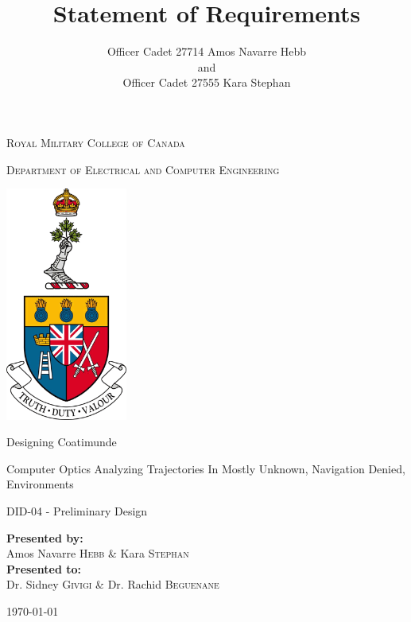 \documentclass{article}
\title{Statement of Requirements}
\author{Officer Cadet 27714 Amos Navarre Hebb\\and\\Officer Cadet 27555 Kara Stephan}
\begin{document}
	
\begin{titlepage}
	\begin{center}
		\vspace*{1cm}
		
		\LARGE\textsc{Royal Military College of Canada}\normalsize
		
		\vspace{0.2cm}
		
		\textsc{Department of Electrical and Computer Engineering}
		
		\vspace{1.5cm}
		
		\includegraphics[width=0.3\textwidth]{rmcLogo.png}
		
		\vspace{1.5cm}
		
		\LARGE{Designing Coatimunde\\}
		
		\vspace{0.2cm}
		
		\normalsize{Computer Optics Analyzing Trajectories In Mostly Unknown, Navigation Denied, Environments}
		
		\vspace{0.1cm}
		
		\normalsize{DID-04 - Preliminary Design}
		
		\vfill
		
		\textbf{Presented by:}\\Amos Navarre \textsc{Hebb} \& Kara \textsc{Stephan}\\
		\vspace{0.8cm}
		\textbf{Presented to:}\\Dr. Sidney \textsc{Givigi} \& Dr. Rachid \textsc{Beguenane}
		\vspace{0.8cm}
		
		\today
		
	\end{center}
\end{titlepage}
\end{document}
